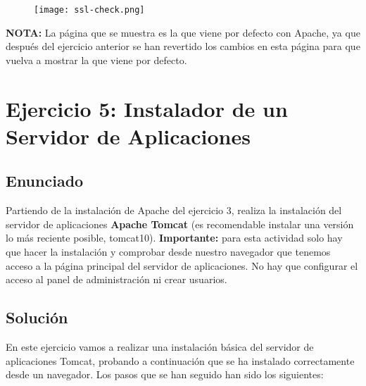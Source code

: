 \begin{enumerate}
    \begin{figure}[H]
        \centering
        \texttt{[image: ssl-check.png]}
    \end{figure}

    \textbf{NOTA:} La página que se muestra es la que viene por defecto con Apache, ya que después del ejercicio anterior se han revertido los cambios en esta página para que vuelva a mostrar la que viene por defecto.
\end{enumerate}

\section{Ejercicio 5: Instalador de un Servidor de Aplicaciones}
\subsection{Enunciado}
Partiendo de la instalación de Apache del ejercicio 3, realiza la instalación del servidor de aplicaciones \textbf{Apache Tomcat} (es recomendable instalar una versión lo más reciente posible, tomcat10). \textbf{Importante:} para esta actividad solo hay que hacer la instalación y comprobar desde nuestro navegador que tenemos acceso a la página principal del servidor de aplicaciones. No hay que configurar el acceso al panel de administración ni crear usuarios.

\subsection{Solución}
En este ejercicio vamos a realizar una instalación básica del servidor de aplicaciones Tomcat, probando a continuación que se ha instalado correctamente desde un navegador. Los pasos que se han seguido han sido los siguientes:

